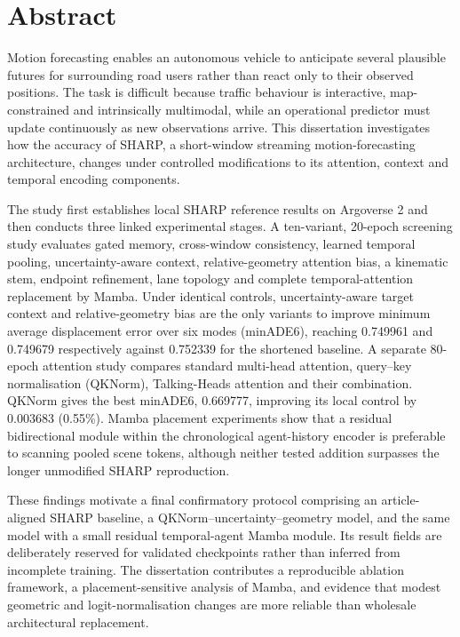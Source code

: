 \chapter*{Abstract}
Motion forecasting enables an autonomous vehicle to anticipate several plausible futures for surrounding road users rather than react only to their observed positions. The task is difficult because traffic behaviour is interactive, map-constrained and intrinsically multimodal, while an operational predictor must update continuously as new observations arrive. This dissertation investigates how the accuracy of SHARP, a short-window streaming motion-forecasting architecture, changes under controlled modifications to its attention, context and temporal encoding components.

The study first establishes local SHARP reference results on Argoverse 2 and then conducts three linked experimental stages. A ten-variant, 20-epoch screening study evaluates gated memory, cross-window consistency, learned temporal pooling, uncertainty-aware context, relative-geometry attention bias, a kinematic stem, endpoint refinement, lane topology and complete temporal-attention replacement by Mamba. Under identical controls, uncertainty-aware target context and relative-geometry bias are the only variants to improve minimum average displacement error over six modes (minADE6), reaching 0.749961 and 0.749679 respectively against 0.752339 for the shortened baseline. A separate 80-epoch attention study compares standard multi-head attention, query--key normalisation (QKNorm), Talking-Heads attention and their combination. QKNorm gives the best minADE6, 0.669777, improving its local control by 0.003683 (0.55\%). Mamba placement experiments show that a residual bidirectional module within the chronological agent-history encoder is preferable to scanning pooled scene tokens, although neither tested addition surpasses the longer unmodified SHARP reproduction.

These findings motivate a final confirmatory protocol comprising an article-aligned SHARP baseline, a QKNorm--uncertainty--geometry model, and the same model with a small residual temporal-agent Mamba module. Its result fields are deliberately reserved for validated checkpoints rather than inferred from incomplete training. The dissertation contributes a reproducible ablation framework, a placement-sensitive analysis of Mamba, and evidence that modest geometric and logit-normalisation changes are more reliable than wholesale architectural replacement.
